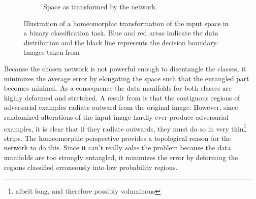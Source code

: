 \documentclass[11pt, a4paper]{article}
\begin{document}
\begin{figure}[h!tb]
\begin{subfigure}[b]{0.45\textwidth}
        \caption{Space as transformed by the network.}
        \label{fig:network-homeomorphism-end}
    \end{subfigure}
    \caption[Network function as homeomorphic transformation of input space]{Illustration of a homeomorphic transformation of the input space in a binary classification task. Blue and red areas indicate the data distribution and the black line represents the decision boundary. Images taken from \cite{neural-network-homeomorphics-transformation}}
    \label{fig:network-homeomorphism}
\end{figure}

Because the chosen network is not powerful enough to disentangle the classes, it minimizes the average error by elongating the space such that the entangled part becomes minimal. As a consequence the data manifolds for both classes are highly deformed and stretched. A result from \cite{explaining-and-harnessing-adversarial-examples} is that the contiguous regions of adversarial examples radiate outward from the original image. However, since randomized alterations of the input image hardly ever produce adversarial examples, it is clear that if they radiate outwards, they must do so in very thin\footnote{albeit long, and therefore possibly voluminous} strips. The homeomorphic perspective provides a topological reason for the network to do this. Since it can't really \emph{solve} the problem because the data manifolds are too strongly entangled, it minimizes the error by deforming the regions classified erroneously into low probability regions.

\end{document}
